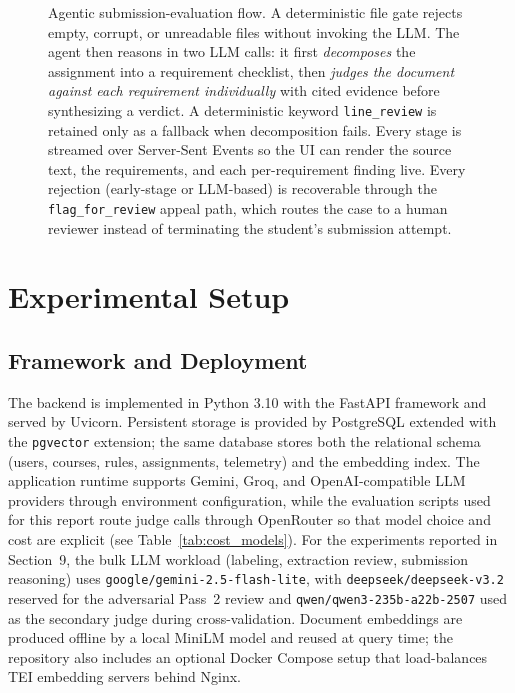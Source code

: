 \documentclass[a4paper,12pt]{article}
\begin{document}
\begin{figure}[H]
{}
    \caption{Agentic submission-evaluation flow. A deterministic file gate rejects empty, corrupt, or unreadable files without invoking the LLM. The agent then reasons in two LLM calls: it first \emph{decomposes} the assignment into a requirement checklist, then \emph{judges the document against each requirement individually} with cited evidence before synthesizing a verdict. A deterministic keyword \texttt{line\_review} is retained only as a fallback when decomposition fails. Every stage is streamed over Server-Sent Events so the UI can render the source text, the requirements, and each per-requirement finding live. Every rejection (early-stage or LLM-based) is recoverable through the \texttt{flag\_for\_review} appeal path, which routes the case to a human reviewer instead of terminating the student's submission attempt.}
    \label{fig:submission_flow}
\end{figure}

\section{Experimental Setup}
\subsection{Framework and Deployment}
The backend is implemented in Python 3.10 with the FastAPI framework and served by Uvicorn. Persistent storage is provided by PostgreSQL extended with the \texttt{pgvector} extension; the same database stores both the relational schema (users, courses, rules, assignments, telemetry) and the embedding index. The application runtime supports Gemini, Groq, and OpenAI-compatible LLM providers through environment configuration, while the evaluation scripts used for this report route judge calls through OpenRouter so that model choice and cost are explicit (see Table~\ref{tab:cost_models}). For the experiments reported in Section~9, the bulk LLM workload (labeling, extraction review, submission reasoning) uses \texttt{google/gemini-2.5-flash-lite}, with \texttt{deepseek/deepseek-v3.2} reserved for the adversarial Pass~2 review and \texttt{qwen/qwen3-235b-a22b-2507} used as the secondary judge during cross-validation. Document embeddings are produced offline by a local MiniLM model and reused at query time; the repository also includes an optional Docker Compose setup that load-balances TEI embedding servers behind Nginx.
\end{document}

